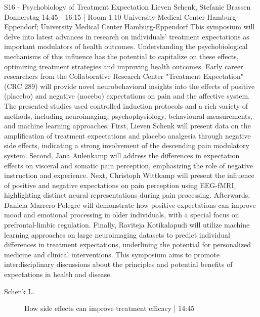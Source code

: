 
            \begin{symposium}
            {S16 - Psychobiology of Treatment Expectation }
            { Lieven Schenk, Stefanie Brassen}
            {Donnerstag 14:45 - 16:15 | Room 1.10}
            {University Medical Center Hamburg-Eppendorf; University Medical Center Hamburg-Eppendorf}
            This symposium will delve into latest advances in research on individuals’ treatment expectations as important modulators of health outcomes. Understanding the psychobiological mechanisms of this influence has the potential to capitalize on these effects, optimizing treatment strategies and improving health outcomes. Early career researchers from the Collaborative Research Center "Treatment Expectation" (CRC 289) will provide novel neurobehavioral insights into the effects of positive (placebo) and negative (nocebo) expectations on pain and the affective system. The presented studies used controlled induction protocols and a rich variety of methods, including neuroimaging, psychophysiology, behavioural measurements, and machine learning approaches.
First, Lieven Schenk will present data on the amplification of treatment expectations and placebo analgesia through negative side effects, indicating a strong involvement of the descending pain modulatory system. Second, Jana Aulenkamp will address the differences in expectation effects on visceral and somatic pain perception, emphasizing the role of negative instruction and experience. Next, Christoph Wittkamp will present the influence of positive and negative expectations on pain perception using EEG-fMRI, highlighting distinct neural representations during pain processing. Afterwards, Daniela Marrero Polegre will demonstrate how positive expectations can improve mood and emotional processing in older individuals, with a special focus on prefrontal-limbic regulation. Finally, Raviteja Kotikalapudi will utilize machine learning approaches on large neuroimaging datasets to predict individual differences in treatment expectations, underlining the potential for personalized medicine and clinical interventions.
This symposium aims to promote interdisciplinary discussions about the principles and potential benefits of expectations in health and disease.
            \begin{description}    
            
                \item [ Schenk L.] How side effects can improve treatment efficacy \textcolor{mygray}{ | 14:45}    
                

\end{description}
\end{symposium}
